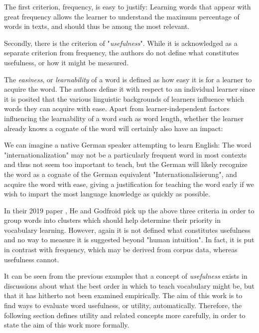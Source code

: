 The first criterion, frequency, is easy to justify:
Learning words that appear with great frequency allows the learner to understand the maximum percentage of words in texts, and should thus be among the most relevant.

Secondly, there is the criterion of "\textit{usefulness}".
While it is acknowledged as a separate criterion from frequency, the authors do not define what constitutes usefulness, or how it might be measured.

The \textit{easiness}, or \textit{learnability} of a word is defined as how easy it is for a learner to acquire the word.
The authors define it with respect to an individual learner since it is posited that the various linguistic backgrounds of learners influence which words they can acquire with ease.
Apart from learner-independent factors influencing the learnability of a word such as word length, whether the learner already knows a cognate of the word will certainly also have an impact:

We can imagine a native German speaker attempting to learn English:
The word "internationalization" may not be a particularly frequent word in most contexts and thus not seem too important to teach, but the German will likely recognize the word as a cognate of the German equivalent "Internationalisierung", and acquire the word with ease, giving a justification for teaching the word early if we wish to impart the most language knowledge as quickly as possible.

In their 2019 paper \cite{heChoosingWordsTeach2019}, He and Godfroid pick up the above three criteria in order to group words into clusters which should help determine their priority in vocabulary learning.
However, again it is not defined what constitutes usefulness and no way to measure it is suggested beyond "human intuition".
In fact, it is put in contrast with frequency, which may be derived from corpus data, whereas usefulness cannot.

It can be seen from the previous examples that a concept of \textit{usefulness} exists in discussions about what the best order in which to teach vocabulary might be, but that it has hitherto not been examined empirically.
The aim of this work is to find ways to evaluate word usefulness, or utility, automatically.
Therefore, the following section defines utility and related concepts more carefully, in order to state the aim of this work more formally.

